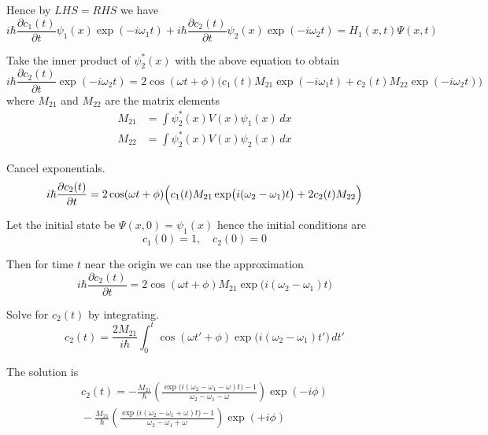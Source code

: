 Hence by $LHS=RHS$ we have
\begin{equation*}
i\hbar\frac{\partial c_1(t)}{\partial t}\psi_1(x)\exp(-i\omega_1t)
+i\hbar\frac{\partial c_2(t)}{\partial t}\psi_2(x)\exp(-i\omega_2t)
=H_1(x,t)\Psi(x,t)
\end{equation*}

Take the inner product of $\psi_2^*(x)$ with the above equation to obtain
\begin{equation*}
i\hbar\frac{\partial c_2(t)}{\partial t}\exp(-i\omega_2t)
=2\cos(\omega t+\phi)
\bigl(
c_1(t)M_{21}\exp(-i\omega_1t)+
c_2(t)M_{22}\exp(-i\omega_2t)
\bigr)
\end{equation*}
%
where $M_{21}$ and $M_{22}$ are the matrix elements
\begin{align*}
M_{21}&=\int\psi_2^*(x)V(x)\psi_1(x)\,dx
\\
M_{22}&=\int\psi_2^*(x)V(x)\psi_2(x)\,dx
\end{align*}

Cancel exponentials.
\begin{equation*}
i\hbar\frac{\partial c_2(t)}{\partial t}
=2\cos(\omega t+\phi)
\Bigl(
c_1(t)M_{21}\exp\bigl(i(\omega_2-\omega_1)t\bigr)+2c_2(t)M_{22}
\Bigr)
\end{equation*}

Let the initial state be $\Psi(x,0)=\psi_1(x)$ hence the initial conditions are
\begin{equation*}
c_1(0)=1,\quad c_2(0)=0
\end{equation*}

Then for time $t$ near the origin we can use the approximation
\begin{equation*}
i\hbar\frac{\partial c_2(t)}{\partial t}
=2\cos(\omega t+\phi)M_{21}\exp\bigl(i(\omega_2-\omega_1)t\bigr)
\end{equation*}

Solve for $c_2(t)$ by integrating.
\begin{equation*}
c_2(t)=\frac{2M_{21}}{i\hbar}
\int_0^t\cos(\omega t'+\phi)\exp\bigl(i(\omega_2-\omega_1)t'\bigr)\,dt'
\end{equation*}

The solution is
\begin{multline*}
c_2(t)
=-\frac{M_{21}}{\hbar}
\left(
\frac{\exp\bigl(i(\omega_2-\omega_1-\omega) t\bigr)-1}{\omega_2-\omega_1-\omega}
\right)\exp(-i\phi)
\\{}-\frac{M_{21}}{\hbar}
\left(
\frac{\exp\bigl(i(\omega_2-\omega_1+\omega) t\bigr)-1}{\omega_2-\omega_1+\omega}
\right)\exp(+i\phi)
\tag{1}
\end{multline*}

